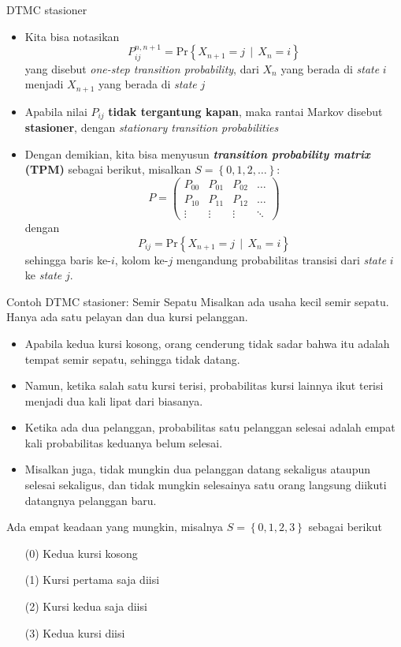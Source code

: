 \documentclass{beamer}
\newcommand{\braces}[1]{\left\{#1\right\}}
\begin{document}
\begin{frame}{DTMC stasioner}
    \begin{itemize}
        \item Kita bisa notasikan
        \[ P_{ij}^{n,n+1} = \text{Pr}\braces{X_{n+1} = j \, \mid \, X_n = i} \]
        yang disebut \textit{one-step transition probability}, dari \(X_n\) yang berada di \textit{state} \(i\) menjadi \(X_{n+1}\) yang berada di \textit{state} \(j\)
        \item Apabila nilai \(P_{ij}\) \textbf{tidak tergantung kapan}, maka rantai Markov disebut \textbf{stasioner}, dengan \textit{stationary transition probabilities}
        \item Dengan demikian, kita bisa menyusun \textbf{\textit{transition probability matrix} (TPM)} sebagai berikut, misalkan \(S=\braces{0,1,2,\dots}\):
        \[ P = \begin{pmatrix}
            P_{00} & P_{01} & P_{02} & \dots \\
            P_{10} & P_{11} & P_{12} & \dots \\
            \vdots & \vdots & \vdots & \ddots
        \end{pmatrix} \]
        dengan
        \[ P_{ij} = \text{Pr}\braces{X_{n+1} = j \, \mid \, X_n = i} \]
        sehingga baris ke-\(i\), kolom ke-\(j\) mengandung probabilitas transisi dari \textit{state} \(i\) ke \textit{state} \(j\).
    \end{itemize}
\end{frame}

\begin{frame}{Contoh DTMC stasioner: Semir Sepatu}
    Misalkan ada usaha kecil semir sepatu. Hanya ada satu pelayan dan dua kursi pelanggan.
    \begin{itemize}
        \item Apabila kedua kursi kosong, orang cenderung tidak sadar bahwa itu adalah tempat semir sepatu, sehingga tidak datang.
        \item Namun, ketika salah satu kursi terisi, probabilitas kursi lainnya ikut terisi menjadi dua kali lipat dari biasanya.
        \item Ketika ada dua pelanggan, probabilitas satu pelanggan selesai adalah empat kali probabilitas keduanya belum selesai.
        \item Misalkan juga, tidak mungkin dua pelanggan datang sekaligus ataupun selesai sekaligus, dan tidak mungkin selesainya satu orang langsung diikuti datangnya pelanggan baru.
    \end{itemize}

    Ada empat keadaan yang mungkin, misalnya \( S = \braces{0,1,2,3} \) sebagai berikut
    \begin{enumerate}
        \item[(0)] Kedua kursi kosong
        \item[(1)] Kursi pertama saja diisi
        \item[(2)] Kursi kedua saja diisi
        \item[(3)] Kedua kursi diisi
    \end{enumerate}
\end{frame}
\end{document}
